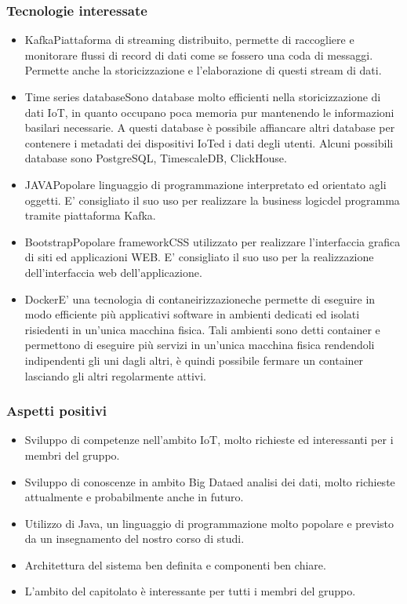 \subsubsection{Tecnologie interessate}
\begin{itemize}
	\item Kafka\glosp Piattaforma di streaming distribuito, permette di raccogliere e monitorare flussi di record di dati come se fossero una coda di messaggi. Permette anche la storicizzazione e l'elaborazione di questi stream di dati.	
	\item Time series database\glosp Sono database molto efficienti nella storicizzazione di dati IoT\glo, in quanto occupano poca memoria pur mantenendo le informazioni basilari necessarie. A questi database è possibile affiancare altri database per contenere i metadati dei dispositivi IoT\glosp ed i dati degli utenti. Alcuni possibili database sono PostgreSQL\glo, TimescaleDB\glo, ClickHouse\glo.
	\item JAVA\glosp Popolare linguaggio di programmazione interpretato ed orientato agli oggetti. E' consigliato il suo uso per realizzare la business logic\glosp del programma tramite piattaforma Kafka\glo.
	\item Bootstrap\glosp Popolare framework\glosp CSS utilizzato per realizzare l'interfaccia grafica di siti ed applicazioni WEB. E' consigliato il suo uso per la realizzazione dell'interfaccia web dell'applicazione.
	\item Docker\glosp E' una tecnologia di contaneirizzazione\glosp che permette di eseguire in modo efficiente più applicativi software in ambienti dedicati ed isolati risiedenti in un'unica macchina fisica. Tali ambienti sono detti container e permettono di eseguire più servizi in un'unica macchina fisica rendendoli indipendenti gli uni dagli altri, è quindi possibile fermare un container lasciando gli altri regolarmente attivi.
\end{itemize} 
\subsubsection{Aspetti positivi}
\begin{itemize} 
	\item Sviluppo di competenze nell'ambito IoT\glo, molto richieste ed interessanti per i membri del gruppo.
	\item Sviluppo di conoscenze in ambito Big Data\glosp ed analisi dei dati, molto richieste attualmente e probabilmente anche in futuro.
	\item Utilizzo di Java, un linguaggio di programmazione molto popolare e previsto da un insegnamento del nostro corso di studi.
	\item Architettura del sistema ben definita e componenti ben chiare.
	\item L'ambito del capitolato è interessante per tutti i membri del gruppo.
\end{itemize}
